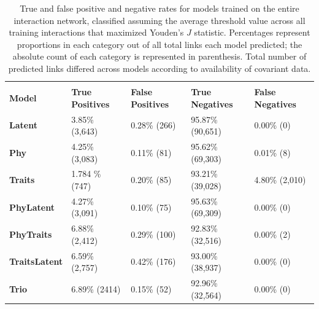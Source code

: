 \documentclass[openacc]{rsproca_new}%
\begin{document}
\begin{table}[]
\caption{True and false positive and negative rates for models trained on the entire interaction network, classified assuming the average threshold value across all training interactions that maximized Youden's $J$ statistic. Percentages represent proportions in each category out of all total links each model predicted; the absolute count of each category is represented in parenthesis. Total number of predicted links differed across models according to availability of covariant data.}
\label{tab:confusion}
\begin{tabular}{@{}lllll@{}}
\toprule
{\ul } & {\ul } & {\ul } & {\ul } & {\ul } \\ 
   \textbf{Model}    &  \textbf{True Positives}      &    \textbf{False Positives}    &    \textbf{True Negatives}    &    \textbf{False Negatives}    \\
\midrule
\textbf{Latent}   &  3.85\% (3,643)      &    0.28\% (266)    &    95.87\% (90,651)    &    0.00\% (0)    \\
\textbf{Phy}       &   4.25\% (3,083)     &  0.11\% (81)      &   95.62\% (69,303)     &    0.01\% (8)    \\
\textbf{Traits}       &   1.784 \% (747)     &  0.20\% (85)      &  93.21\% (39,028)      &       4.80\% (2,010)  \\ 
\textbf{PhyLatent}       &    4.27\% (3,091)    &     0.10\% (75)   &    95.63\% (69,309)    &    0.00\% (0)     \\ 
\textbf{PhyTraits}      &   6.88\% (2,412)     &  0.29\% (100)      &    92.83\% (32,516)    &   0.00\% (2)    \\ 
\textbf{TraitsLatent}       &   6.59\% (2,757)     & 0.42\% (176)       & 93.00\% (38,937)       &   0.00\% (0)     \\ 
\textbf{Trio}       &   6.89\% (2414)     &  0.15\% (52)      &  92.96\% (32,564)      &     0.00\% (0)    \\ 
\bottomrule
\end{tabular}
\end{table}


\clearpage 



\end{document}
